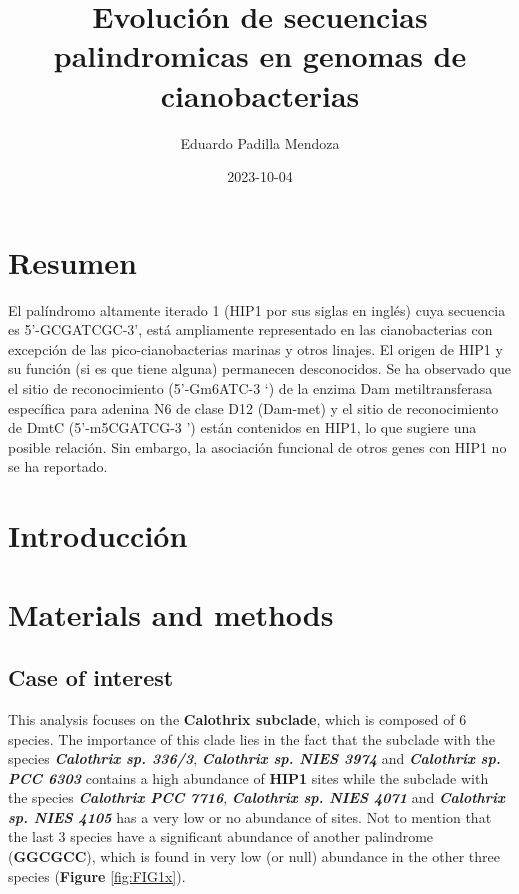\documentclass[
]{book}
\title{Evolución de secuencias palindromicas en genomas de cianobacterias}
\author{Eduardo Padilla Mendoza}
\date{2023-10-04}
\begin{document}
\maketitle

{
\setcounter{tocdepth}{1}
\tableofcontents
}
\hypertarget{resumen}{%
\chapter*{Resumen}\label{resumen}}

El palíndromo altamente iterado 1 (HIP1 por sus siglas en inglés) cuya secuencia es 5'-GCGATCGC-3', está ampliamente representado en las cianobacterias con excepción de las pico-cianobacterias marinas y otros linajes. El origen de HIP1 y su función (si es que tiene alguna) permanecen desconocidos. Se ha observado que el sitio de reconocimiento (5'-Gm6ATC-3 `) de la enzima Dam metiltransferasa específica para adenina N6 de clase D12 (Dam-met) y el sitio de reconocimiento de DmtC (5'-m5CGATCG-3 ') están contenidos en HIP1, lo que sugiere una posible relación. Sin embargo, la asociación funcional de otros genes con HIP1 no se ha reportado.

\hypertarget{introducciuxf3n}{%
\chapter{Introducción}\label{introducciuxf3n}}

\hypertarget{materials-and-methods}{%
\chapter{Materials and methods}\label{materials-and-methods}}

\hypertarget{case-of-interest}{%
\section{Case of interest}\label{case-of-interest}}

This analysis focuses on the \textbf{Calothrix subclade}, which is composed of 6 species. The importance of this clade lies in the fact that the subclade with the species \textbf{\emph{Calothrix sp. 336/3}}, \textbf{\emph{Calothrix sp. NIES 3974}} and \textbf{\emph{Calothrix sp. PCC 6303}} contains a high abundance of \textbf{HIP1} sites while the subclade with the species \textbf{\emph{Calothrix PCC 7716}}, \textbf{\emph{Calothrix sp. NIES 4071}} and \textbf{\emph{Calothrix sp. NIES 4105}} has a very low or no abundance of sites. Not to mention that the last 3 species have a significant abundance of another palindrome (\textbf{GGCGCC}), which is found in very low (or null) abundance in the other three species (\textbf{Figure} \ref{fig:FIG1x}).
\end{document}
